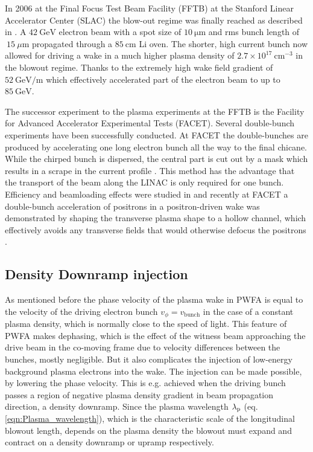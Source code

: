 In 2006 at the Final Focus Test Beam Facility (FFTB) at the Stanford Linear Accelerator Center (SLAC) the blow-out regime was finally reached as described in \cite{blumenfeld2007energyDoubling}.
A $42\ \mathrm{GeV}$ electron beam with a spot size of $10\ \mathrm{\mu m}$ and rms bunch length of $~15\ \mu\mathrm{m}$ propagated through a $85\ \mathrm{cm}$ Li oven. The shorter, high current bunch now allowed for driving a wake in a much higher plasma density of $2.7\times 10^{17}\ \mathrm{cm}^{-3} $ in the blowout regime. Thanks to the extremely high wake field gradient of $52\ \mathrm{GeV/m}$ which effectively accelerated part of the electron beam to up to $85\ \mathrm{GeV}$.

The successor experiment to the plasma experiments at the FFTB is the Facility for Advanced Accelerator Experimental Tests (FACET)\cite{clarke2012facet}. Several double-bunch experiments have been successfully conducted.  
At FACET the double-bunches are produced by accelerating one long electron bunch all the way to the final chicane. 
While the chirped bunch is dispersed, the central part is cut out by a mask which results in a scrape in the current profile  \cite{hogan2010FACET}. This method has the advantage that the transport of the beam along the LINAC is only required for one bunch.
Efficiency and beamloading effects were studied in \cite{litos2014high} and recently at FACET a double-bunch acceleration of positrons in a positron-driven wake was demonstrated by shaping the transverse plasma shape to a hollow channel, which effectively avoids any transverse fields that would otherwise defocus the positrons \cite{ThesisGessner}.
\subsection{Density Downramp injection}


As mentioned before the phase velocity of the plasma wake in PWFA is equal to the velocity of the driving electron bunch $v_\phi=v_\mathrm{bunch}$ in the case of a constant plasma density, which is normally close to the speed of light. This feature of PWFA makes dephasing, which is the effect of the witness beam approaching the drive beam in the co-moving frame due to velocity differences between the bunches, mostly negligible. But it also complicates the injection of low-energy background plasma electrons into the wake. 
The injection can be made possible, by lowering the phase velocity. This is e.g. achieved when the driving bunch passes a region of negative plasma density gradient in beam propagation direction, a density downramp. 
Since the plasma wavelength $\lambda_\mathrm{p}$ (eq. \ref{eqn:Plasma_wavelength}), which is the characteristic scale of the longitudinal blowout length, depends on the plasma density the blowout must expand and contract on a density downramp or upramp respectively.

